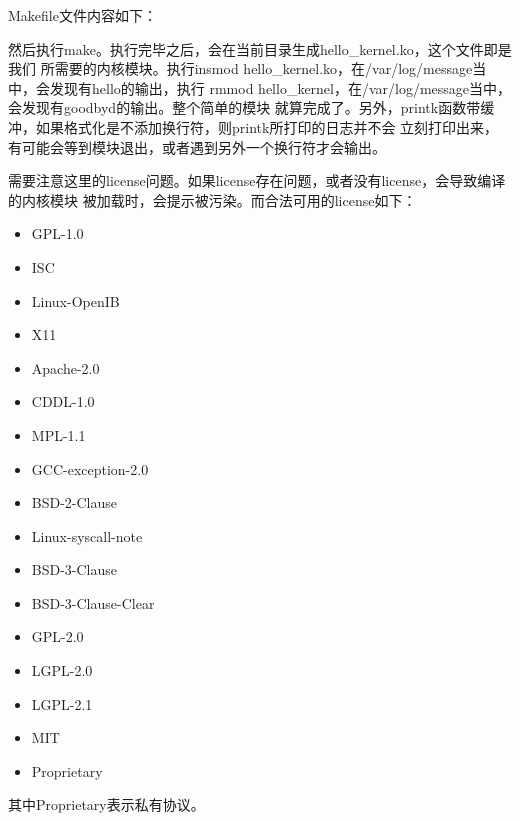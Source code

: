 Makefile文件内容如下：

然后执行make。执行完毕之后，会在当前目录生成hello\_kernel.ko，这个文件即是我们
所需要的内核模块。执行insmod hello\_kernel.ko，在/var/log/message当中，会发现有hello的输出，执行
rmmod hello\_kernel，在/var/log/message当中，会发现有goodbyd的输出。整个简单的模块
就算完成了。另外，printk函数带缓冲，如果格式化是不添加换行符，则printk所打印的日志并不会
立刻打印出来，有可能会等到模块退出，或者遇到另外一个换行符才会输出。

需要注意这里的license问题。如果license存在问题，或者没有license，会导致编译的内核模块
被加载时，会提示被污染。而合法可用的license如下：
\begin{itemize}
  \item GPL-1.0
  \item ISC
  \item Linux-OpenIB
  \item X11
  \item Apache-2.0
  \item CDDL-1.0
  \item MPL-1.1
  \item GCC-exception-2.0
  \item BSD-2-Clause
  \item Linux-syscall-note
  \item BSD-3-Clause
  \item BSD-3-Clause-Clear
  \item GPL-2.0
  \item LGPL-2.0
  \item LGPL-2.1
  \item MIT
  \item Proprietary
\end{itemize}

其中Proprietary表示私有协议。

